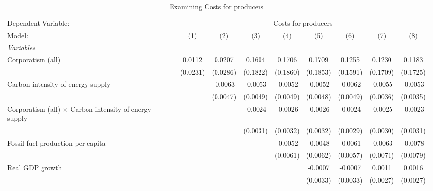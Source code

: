 
\begin{table}[htbp]
   \caption{Examining Costs for producers}
   \centering
   \begin{tabular}{lcccccccc}
      \tabularnewline \midrule \midrule
      Dependent Variable: & \multicolumn{8}{c}{Costs for producers}\\
      Model:                                                        & (1)      & (2)      & (3)      & (4)      & (5)      & (6)      & (7)      & (8)\\  
      \midrule
      \emph{Variables}\\
      Corporatism (all)                                             & 0.0112   & 0.0207   & 0.1604   & 0.1706   & 0.1709   & 0.1255   & 0.1230   & 0.1183\\   
                                                                    & (0.0231) & (0.0286) & (0.1822) & (0.1860) & (0.1853) & (0.1591) & (0.1709) & (0.1725)\\   
      Carbon intensity of energy supply                             &          & -0.0063  & -0.0053  & -0.0052  & -0.0052  & -0.0062  & -0.0055  & -0.0053\\   
                                                                    &          & (0.0047) & (0.0049) & (0.0049) & (0.0048) & (0.0049) & (0.0036) & (0.0035)\\   
      Corporatism (all) $\times$ Carbon intensity of energy supply  &          &          & -0.0024  & -0.0026  & -0.0026  & -0.0024  & -0.0025  & -0.0023\\   
                                                                    &          &          & (0.0031) & (0.0032) & (0.0032) & (0.0029) & (0.0030) & (0.0031)\\   
      Fossil fuel production per capita                             &          &          &          & -0.0052  & -0.0048  & -0.0061  & -0.0063  & -0.0078\\   
                                                                    &          &          &          & (0.0061) & (0.0062) & (0.0057) & (0.0071) & (0.0079)\\   
      Real GDP growth                                               &          &          &          &          & -0.0007  & -0.0007  & 0.0011   & 0.0016\\   
                                                                    &          &          &          &          & (0.0033) & (0.0033) & (0.0027) & (0.0027)\\   

\end{tabular}
\end{table}
